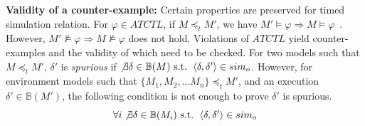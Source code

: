 \textbf{Validity of a counter-example: }
Certain properties are preserved for timed simulation relation. For $\varphi\in ATCTL$, if $M\preceq_t M'$, we have $M'\models \varphi\Rightarrow M\models\varphi$~\cite{CEGAR}. However, $M'\not\models \varphi\Rightarrow M\not\models\varphi$ does not hold. Violations of $ATCTL$ yield \textsf{counter-examples} and the validity of which need to be checked.
For two models such that $M\preceq_t M'$, $\delta'$ is \emph{spurious} if $\not\exists \delta\in\mathbb{B}(M) \text{ s.t. }\left\langle\delta,\delta'\right\rangle\in sim_o$.
However, for environment models such that $\{M_1,M_2,...M_n\}\preceq_t M'$, and an execution $\delta'\in\mathbb{B}(M')$, the following condition is not enough to prove $\delta'$ is spurious.
$$\forall i\not\exists \delta\in\mathbb{B}(M_i)\text{ s.t. }\left\langle\delta,\delta'\right\rangle\in sim_o$$
\vspace{-15pt}


